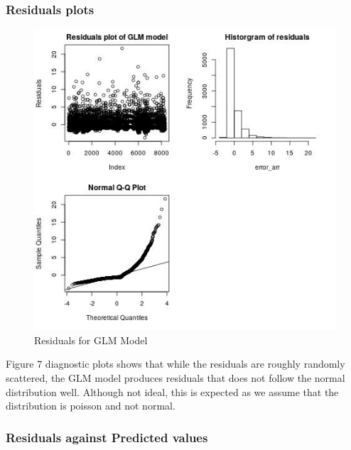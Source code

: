 \documentclass[12pt, letterpaper] {article}
\begin{document}
\subsubsection{Residuals plots}

\begin{figure}[H]
    \centering
    \includegraphics[width=\textwidth, height=0.7\textheight]{Images/Full_GLM_resids.jpg}
    \caption{Residuals for GLM Model}
    \label{fig:Residuals for GLM Model}
\end{figure}

\noindent Figure 7 diagnostic plots shows that while the residuals are roughly randomly scattered, the GLM model produces residuals that does not follow the normal distribution well. Although not ideal, this is expected as we assume that the distribution is poisson and not normal. 

\subsubsection{Residuals against Predicted values}
\end{document}
